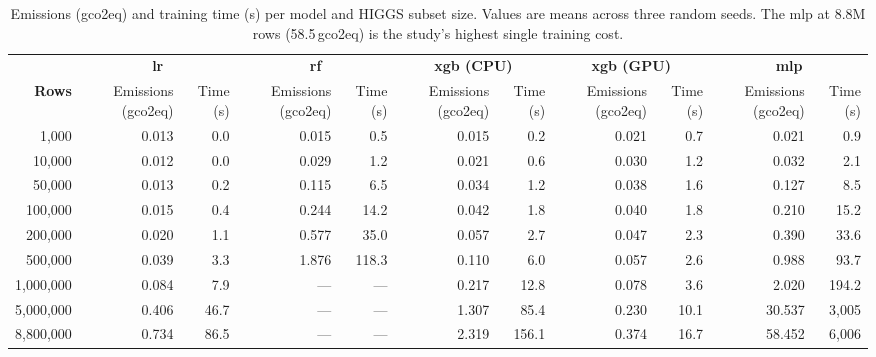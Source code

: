 \begin{table}
\centering
\footnotesize
\caption[Emissions and training time per model across HIGGS subset sizes.]{Emissions (\acrshort{gco2eq}) and training time (s) per model and HIGGS subset size. Values are means across three random seeds. The \acrshort{mlp} at 8.8M rows (58.5\,\acrshort{gco2eq}) is the study's highest single training cost.}
\label{tab:app_scaling_co2}
\setlength{\tabcolsep}{4pt}
\begin{tabular}{@{} r rr rr rr rr rr @{}}
\toprule
 & \multicolumn{2}{c}{\textbf{\gls{lr}}} & \multicolumn{2}{c}{\textbf{\gls{rf}}} & \multicolumn{2}{c}{\textbf{\gls{xgb} (CPU)}} & \multicolumn{2}{c}{\textbf{\gls{xgb} (GPU)}} & \multicolumn{2}{c}{\textbf{\gls{mlp}}} \\
\cmidrule(lr){2-3}\cmidrule(lr){4-5}\cmidrule(lr){6-7}\cmidrule(lr){8-9}\cmidrule(lr){10-11}
\textbf{Rows} & Emissions (\gls{gco2eq}) & Time (s) & Emissions (\gls{gco2eq}) & Time (s) & Emissions (\gls{gco2eq}) & Time (s) & Emissions (\gls{gco2eq}) & Time (s) & Emissions (\gls{gco2eq}) & Time (s) \\
\midrule
1{,}000        & 0.013 & 0.0  & 0.015 & 0.5    & 0.015 & 0.2  & 0.021 & 0.7  & 0.021 & 0.9    \\
10{,}000       & 0.012 & 0.0  & 0.029 & 1.2    & 0.021 & 0.6  & 0.030 & 1.2  & 0.032 & 2.1    \\
50{,}000       & 0.013 & 0.2  & 0.115 & 6.5    & 0.034 & 1.2  & 0.038 & 1.6  & 0.127 & 8.5    \\
100{,}000      & 0.015 & 0.4  & 0.244 & 14.2   & 0.042 & 1.8  & 0.040 & 1.8  & 0.210 & 15.2   \\
200{,}000      & 0.020 & 1.1  & 0.577 & 35.0   & 0.057 & 2.7  & 0.047 & 2.3  & 0.390 & 33.6   \\
500{,}000      & 0.039 & 3.3  & 1.876 & 118.3  & 0.110 & 6.0  & 0.057 & 2.6  & 0.988 & 93.7   \\
1{,}000{,}000  & 0.084 & 7.9  & ---   & ---    & 0.217 & 12.8 & 0.078 & 3.6  & 2.020 & 194.2  \\
5{,}000{,}000  & 0.406 & 46.7 & ---   & ---    & 1.307 & 85.4 & 0.230 & 10.1 & 30.537 & 3{,}005 \\
8{,}800{,}000  & 0.734 & 86.5 & ---   & ---    & 2.319 & 156.1 & 0.374 & 16.7 & 58.452 & 6{,}006 \\
\bottomrule
\end{tabular}
\end{table}


